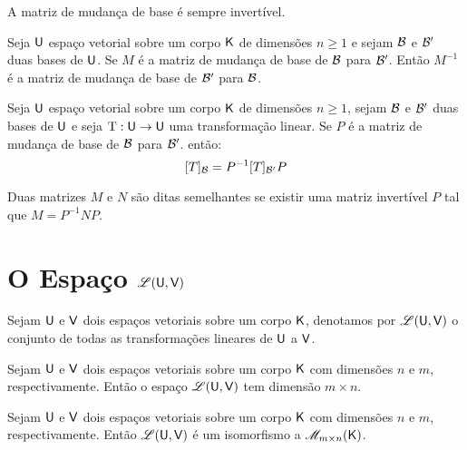 \documentclass[10pt,a4paper]{book}
\begin{document}
\begin{lemma}
	A matriz de mudança de base é sempre invertível.
\end{lemma}

\begin{lemma}
	Seja $\mathsf{ U }$ espaço vetorial sobre um corpo $\mathsf{ K }$ de dimensões $n \geq 1$ e sejam $\mathcal{ B }$ e $\mathcal{ B }'$ duas bases de $\mathsf{ U }$. Se $M$ é a matriz de mudança de base de $\mathcal{ B }$ para $\mathcal{ B }'$. Então $M^{-1}$ é a matriz de mudança de base de $\mathcal{ B }'$ para $\mathcal{ B }$.
\end{lemma}

\begin{lemma}
	Seja $\mathsf{ U }$ espaço vetorial sobre um corpo $\mathsf{ K }$ de dimensões $n \geq 1$, sejam $\mathcal{ B }$ e $\mathcal{ B }'$ duas bases de $\mathsf{ U }$ e seja $\mathrm{ T } : \mathsf{ U } \rightarrow \mathsf{ U }$ uma transformação linear. Se $P$ é a matriz de mudança de base de $\mathcal{ B }$ para $\mathcal{ B }'$. então:
	\[
		[T]_{\mathcal{ B }} = P^{-1}[T]_{\mathcal{ B }'}P
	\]
\end{lemma}

\begin{definition}
	Duas matrizes $M$ e $N$ são ditas semelhantes se existir uma matriz invertível $P$ tal que $M = P^{-1}NP$.
\end{definition}




\section{O Espaço $\mathscr{ L }(\mathsf{ U }, \mathsf{ V })$}

\begin{definition}
	Sejam $\mathsf{ U }$ e $\mathsf{ V }$ dois espaços vetoriais sobre um corpo $\mathsf{ K }$, denotamos por $\mathscr{ L }(\mathsf{ U }, \mathsf{ V })$ o conjunto de todas as transformações lineares de $\mathsf{ U }$ a $\mathsf{ V }$.
\end{definition}

\begin{theorem}
	Sejam $\mathsf{ U }$ e $\mathsf{ V }$ dois espaços vetoriais sobre um corpo $\mathsf{ K }$ com dimensões $n$ e $m$, respectivamente. Então o espaço $\mathscr{ L }(\mathsf{ U }, \mathsf{ V })$ tem dimensão $m \times n$.
\end{theorem}

\begin{corollary}
	Sejam $\mathsf{ U }$ e $\mathsf{ V }$ dois espaços vetoriais sobre um corpo $\mathsf{ K }$ com dimensões $n$ e $m$, respectivamente. Então $\mathscr{ L }(\mathsf{ U }, \mathsf{ V })$ é um isomorfismo a $\mathscr{ M }_{m \times n}(\mathsf{ K })$.
\end{corollary}
\end{document}
